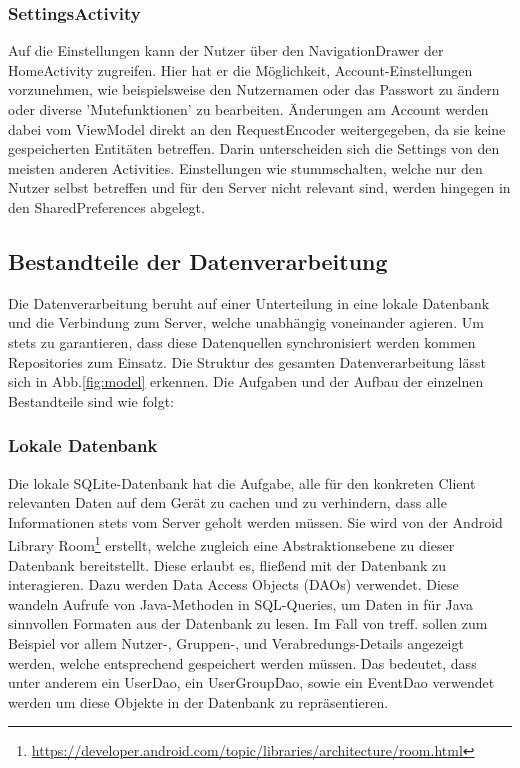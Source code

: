 \documentclass[parskip=full,11pt]{scrartcl}
\begin{document}
\subsubsection{SettingsActivity}

Auf die Einstellungen kann der Nutzer über den NavigationDrawer der HomeActivity
zugreifen. Hier hat er die Möglichkeit, Account-Einstellungen vorzunehmen,
wie beispielsweise den Nutzernamen oder das Passwort zu ändern oder diverse
'Mutefunktionen' zu bearbeiten. Änderungen am Account werden dabei vom ViewModel
direkt an den RequestEncoder weitergegeben, da sie keine gespeicherten Entitäten
betreffen. Darin unterscheiden sich die Settings von den meisten anderen Activities.
Einstellungen wie stummschalten, welche nur den Nutzer selbst betreffen und für
den Server nicht relevant sind, werden hingegen in den SharedPreferences
abgelegt.

\subsection{Bestandteile der Datenverarbeitung}

Die Datenverarbeitung beruht auf einer Unterteilung in eine lokale Datenbank
und die Verbindung zum Server, welche unabhängig voneinander agieren. Um stets
zu garantieren, dass diese Datenquellen synchronisiert werden kommen
Repositories zum Einsatz. Die Struktur des gesamten Datenverarbeitung lässt
sich in Abb.\ref{fig:model} erkennen. Die Aufgaben und der Aufbau der einzelnen
Bestandteile sind wie folgt:

\subsubsection{Lokale Datenbank}

Die lokale SQLite-Datenbank hat die Aufgabe, alle für den konkreten Client
relevanten Daten auf dem Gerät zu cachen und zu verhindern, dass alle
Informationen stets vom Server geholt werden müssen.
Sie wird von der Android Library
Room\footnote{\url{https://developer.android.com/topic/libraries/architecture/room.html}}
erstellt, welche zugleich eine Abstraktionsebene zu dieser
Datenbank bereitstellt. Diese erlaubt es, fließend mit der Datenbank zu
interagieren. Dazu werden Data Access Objects (DAOs) verwendet. Diese
wandeln Aufrufe von Java-Methoden in SQL-Queries, um Daten in für Java
sinnvollen Formaten aus der Datenbank zu lesen. Im Fall von treff. sollen zum
Beispiel vor allem Nutzer-, Gruppen-, und Verabredungs-Details angezeigt
werden, welche entsprechend gespeichert werden müssen. Das bedeutet, dass unter
anderem ein UserDao, ein UserGroupDao, sowie ein EventDao verwendet werden um
diese Objekte in der Datenbank zu repräsentieren.
\end{document}
